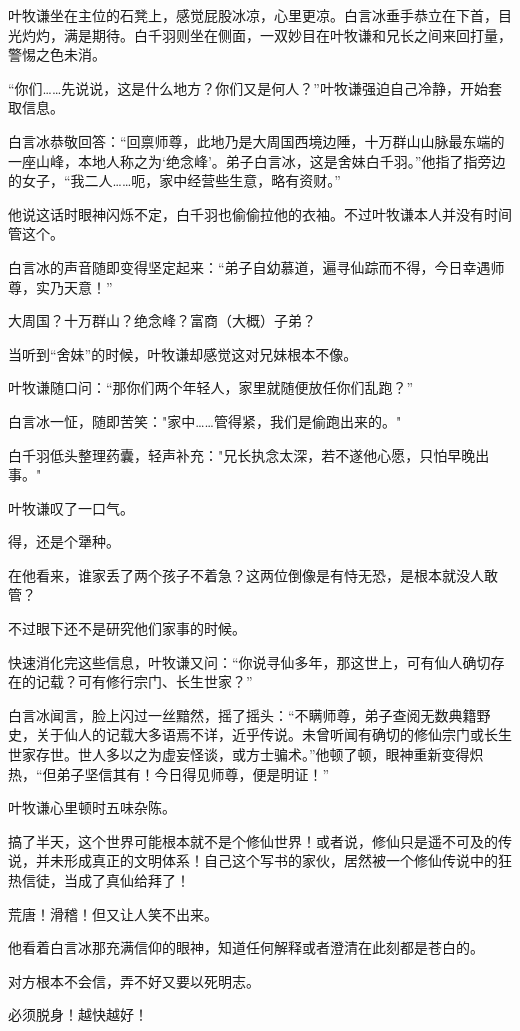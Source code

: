 叶牧谦坐在主位的石凳上，感觉屁股冰凉，心里更凉。白言冰垂手恭立在下首，目光灼灼，满是期待。白千羽则坐在侧面，一双妙目在叶牧谦和兄长之间来回打量，警惕之色未消。

“你们……先说说，这是什么地方？你们又是何人？”叶牧谦强迫自己冷静，开始套取信息。

白言冰恭敬回答：“回禀师尊，此地乃是大周国西境边陲，十万群山山脉最东端的一座山峰，本地人称之为‘绝念峰’。弟子白言冰，这是舍妹白千羽。”他指了指旁边的女子，“我二人……呃，家中经营些生意，略有资财。”

他说这话时眼神闪烁不定，白千羽也偷偷拉他的衣袖。不过叶牧谦本人并没有时间管这个。

白言冰的声音随即变得坚定起来：“弟子自幼慕道，遍寻仙踪而不得，今日幸遇师尊，实乃天意！”

大周国？十万群山？绝念峰？富商（大概）子弟？

当听到“舍妹”的时候，叶牧谦却感觉这对兄妹根本不像。

叶牧谦随口问：“那你们两个年轻人，家里就随便放任你们乱跑？”

白言冰一怔，随即苦笑："家中……管得紧，我们是偷跑出来的。"

白千羽低头整理药囊，轻声补充："兄长执念太深，若不遂他心愿，只怕早晚出事。"

叶牧谦叹了一口气。

得，还是个犟种。

在他看来，谁家丢了两个孩子不着急？这两位倒像是有恃无恐，是根本就没人敢管？

不过眼下还不是研究他们家事的时候。

快速消化完这些信息，叶牧谦又问：“你说寻仙多年，那这世上，可有仙人确切存在的记载？可有修行宗门、长生世家？”

白言冰闻言，脸上闪过一丝黯然，摇了摇头：“不瞒师尊，弟子查阅无数典籍野史，关于仙人的记载大多语焉不详，近乎传说。未曾听闻有确切的修仙宗门或长生世家存世。世人多以之为虚妄怪谈，或方士骗术。”他顿了顿，眼神重新变得炽热，“但弟子坚信其有！今日得见师尊，便是明证！”

叶牧谦心里顿时五味杂陈。

搞了半天，这个世界可能根本就不是个修仙世界！或者说，修仙只是遥不可及的传说，并未形成真正的文明体系！自己这个写书的家伙，居然被一个修仙传说中的狂热信徒，当成了真仙给拜了！

荒唐！滑稽！但又让人笑不出来。

他看着白言冰那充满信仰的眼神，知道任何解释或者澄清在此刻都是苍白的。

对方根本不会信，弄不好又要以死明志。

必须脱身！越快越好！


